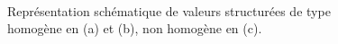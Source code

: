 \documentclass[a4paper,francais]{insalyon}
\begin{document}
\captionsetup[subfigure]{labelformat=empty}
\begin{figure}[htbp]
  \centering
  \parbox[b]{7cm}{
     \\
  }
  \parbox[b]{7cm}{
  }
  \caption{Représentation schématique de valeurs structurées de type homogène en (a) et (b), non homogène en (c).}  
  \label{fig:types}
\end{figure}
\end{document}

